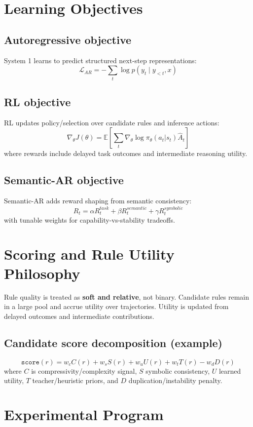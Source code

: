 \documentclass[14pt]{article}
\begin{document}
\section{Learning Objectives}

\subsection{Autoregressive objective}
System 1 learns to predict structured next-step representations:
\[
\mathcal{L}_{AR} = -\sum_t \log p(y_t \mid y_{<t}, x)
\]

\subsection{RL objective}
RL updates policy/selection over candidate rules and inference actions:
\[
\nabla_\theta J(\theta) = \mathbb{E}\left[\sum_t \nabla_\theta \log \pi_\theta(a_t|s_t)\hat{A}_t\right]
\]
where rewards include delayed task outcomes and intermediate reasoning utility.

\subsection{Semantic-AR objective}
Semantic-AR adds reward shaping from semantic consistency:
\[
R_t = \alpha R^{task}_t + \beta R^{semantic}_t + \gamma R^{symbolic}_t
\]
with tunable weights for capability-vs-stability tradeoffs.

\section{Scoring and Rule Utility Philosophy}
Rule quality is treated as \textbf{soft and relative}, not binary.
Candidate rules remain in a large pool and accrue utility over trajectories.
Utility is updated from delayed outcomes and intermediate contributions.

\subsection{Candidate score decomposition (example)}
\[
\texttt{score}(r)=
w_c C(r)+w_s S(r)+w_u U(r)+w_t T(r)-w_d D(r)
\]
where $C$ is compressivity/complexity signal, $S$ symbolic consistency, $U$ learned utility, $T$ teacher/heuristic priors, and $D$ duplication/instability penalty.

\section{Experimental Program}
\end{document}
